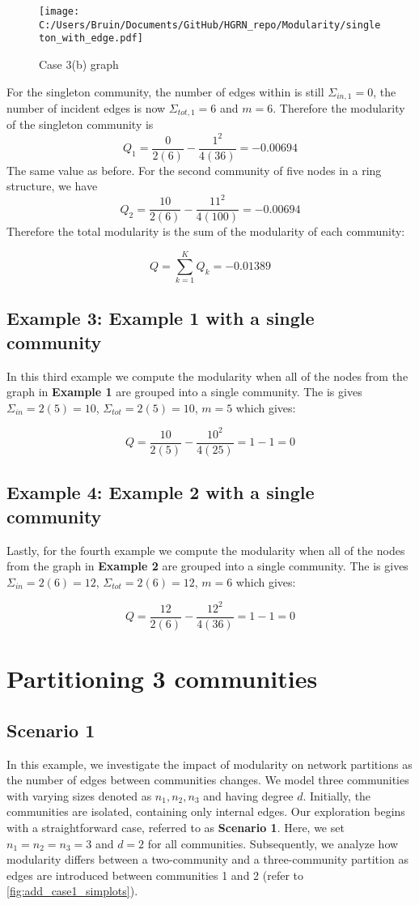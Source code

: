 \documentclass[a4paper,12pt]{article}
\begin{document}
	\begin{figure}[H]
		\centering
		\caption{Case 3(b) graph}
		\texttt{[image: C:/Users/Bruin/Documents/GitHub/HGRN\_repo/Modularity/singleton\_with\_edge.pdf]}
		\label{fig:case3b}
	\end{figure}
	
	For the singleton community, the number of edges within is still $\Sigma_{in,1} = 0$, the number of incident edges is now $\Sigma_{tot,1} = 6$ and $m = 6$. Therefore the modularity of the singleton community is 
	\[Q_1 = \frac{0}{2(6)} - \frac{1^2}{4(36)} = -0.00694\]
	The same value as before. For the second community of five nodes in a ring structure, we have 
	\[Q_2 = \frac{10}{2(6)} - \frac{11^2}{4(100)} = -0.00694\]
	Therefore the total modularity is the sum of the modularity of each community:
	
	\[ Q = \sum_{k=1}^K Q_k = -0.01389\]
	
	\subsection{Example 3: Example 1 with a single community}
	In this third example we compute the modularity when all of the nodes from the graph in \textbf{Example 1} are grouped into a single community. The is gives $\Sigma_{in} = 2(5) = 10$, $\Sigma_{tot} = 2(5) = 10$,  $m = 5$ which gives:
	
	\[ Q = \frac{10}{2(5)}-\frac{10^2}{4(25)} = 1-1 = 0 \]
	\subsection{Example 4: Example 2 with a single community}
	Lastly, for the fourth example we compute the modularity when all of the nodes from the graph in \textbf{Example 2} are grouped into a single community. The is gives $\Sigma_{in} = 2(6) = 12$, $\Sigma_{tot} = 2(6) = 12$,  $m = 6$ which gives:
	
	\[ Q = \frac{12}{2(6)}-\frac{12^2}{4(36)} = 1-1 = 0 \]
	
	\section{Partitioning 3 communities}
	\subsection{Scenario 1}
	In this example, we investigate the impact of modularity on network partitions as the number of edges between communities changes. We model three communities with varying sizes denoted as $n_1, n_2, n_3$ and having degree $d$. Initially, the communities are isolated, containing only internal edges. Our exploration begins with a straightforward case, referred to as \textbf{Scenario 1}. Here, we set $n_1 = n_2 = n_3 = 3$ and $d = 2$ for all communities. Subsequently, we analyze how modularity differs between a two-community and a three-community partition as edges are introduced between communities 1 and 2 (refer to \ref{fig:add_case1_simplots}).
\end{document}
